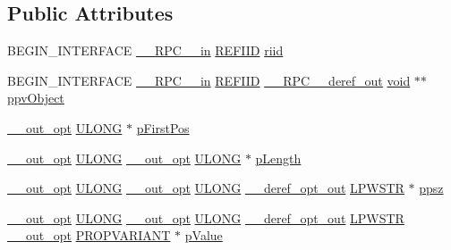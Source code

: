 \subsection*{Public Attributes}
\begin{DoxyCompactItemize}
\item 
B\+E\+G\+I\+N\+\_\+\+I\+N\+T\+E\+R\+F\+A\+CE \hyperlink{rpcsal_8h_a20b7f6da600a05c8b541659f14f7f0e6}{\+\_\+\+\_\+\+R\+P\+C\+\_\+\+\_\+in} \hyperlink{px__win__ds_8c_a80ec49c8ae61e234197d5071d2df497d}{R\+E\+F\+I\+ID} \hyperlink{struct_i_rich_chunk_vtbl_a59fa8bbd08359efd8efb56ecc9561eb5}{riid}
\item 
B\+E\+G\+I\+N\+\_\+\+I\+N\+T\+E\+R\+F\+A\+CE \hyperlink{rpcsal_8h_a20b7f6da600a05c8b541659f14f7f0e6}{\+\_\+\+\_\+\+R\+P\+C\+\_\+\+\_\+in} \hyperlink{px__win__ds_8c_a80ec49c8ae61e234197d5071d2df497d}{R\+E\+F\+I\+ID} \hyperlink{rpcsal_8h_a23bc188526f10656f9c79d950f6c3192}{\+\_\+\+\_\+\+R\+P\+C\+\_\+\+\_\+deref\+\_\+out} \hyperlink{sound_8c_ae35f5844602719cf66324f4de2a658b3}{void} $\ast$$\ast$ \hyperlink{struct_i_rich_chunk_vtbl_ab8607754b8af4a854b417de71c2fad74}{ppv\+Object}
\item 
\hyperlink{sal_8h_a1ab4597e9d0c9bcc3f676c58b25019fe}{\+\_\+\+\_\+out\+\_\+opt} \hyperlink{struct_i_rich_chunk_vtbl_ae509434e2b25f5b32ce7e0ac642b286a}{U\+L\+O\+NG} $\ast$ \hyperlink{struct_i_rich_chunk_vtbl_a29d23cc40cc329fd5d3d189ad00c6f8c}{p\+First\+Pos}
\item 
\hyperlink{sal_8h_a1ab4597e9d0c9bcc3f676c58b25019fe}{\+\_\+\+\_\+out\+\_\+opt} \hyperlink{struct_i_rich_chunk_vtbl_ae509434e2b25f5b32ce7e0ac642b286a}{U\+L\+O\+NG} \hyperlink{sal_8h_a1ab4597e9d0c9bcc3f676c58b25019fe}{\+\_\+\+\_\+out\+\_\+opt} \hyperlink{struct_i_rich_chunk_vtbl_ae509434e2b25f5b32ce7e0ac642b286a}{U\+L\+O\+NG} $\ast$ \hyperlink{struct_i_rich_chunk_vtbl_a1c86628815d0454f86afb2c82889741f}{p\+Length}
\item 
\hyperlink{sal_8h_a1ab4597e9d0c9bcc3f676c58b25019fe}{\+\_\+\+\_\+out\+\_\+opt} \hyperlink{struct_i_rich_chunk_vtbl_ae509434e2b25f5b32ce7e0ac642b286a}{U\+L\+O\+NG} \hyperlink{sal_8h_a1ab4597e9d0c9bcc3f676c58b25019fe}{\+\_\+\+\_\+out\+\_\+opt} \hyperlink{struct_i_rich_chunk_vtbl_ae509434e2b25f5b32ce7e0ac642b286a}{U\+L\+O\+NG} \hyperlink{sal_8h_aca83a5a174d598aaeea78f024e4af103}{\+\_\+\+\_\+deref\+\_\+opt\+\_\+out} \hyperlink{mapinls_8h_acc28f72b93422cfd63a60e5a102a77b1}{L\+P\+W\+S\+TR} $\ast$ \hyperlink{struct_i_rich_chunk_vtbl_a2b7db97f4d16e2075d0acced283e2328}{ppsz}
\item 
\hyperlink{sal_8h_a1ab4597e9d0c9bcc3f676c58b25019fe}{\+\_\+\+\_\+out\+\_\+opt} \hyperlink{struct_i_rich_chunk_vtbl_ae509434e2b25f5b32ce7e0ac642b286a}{U\+L\+O\+NG} \hyperlink{sal_8h_a1ab4597e9d0c9bcc3f676c58b25019fe}{\+\_\+\+\_\+out\+\_\+opt} \hyperlink{struct_i_rich_chunk_vtbl_ae509434e2b25f5b32ce7e0ac642b286a}{U\+L\+O\+NG} \hyperlink{sal_8h_aca83a5a174d598aaeea78f024e4af103}{\+\_\+\+\_\+deref\+\_\+opt\+\_\+out} \hyperlink{mapinls_8h_acc28f72b93422cfd63a60e5a102a77b1}{L\+P\+W\+S\+TR} \hyperlink{sal_8h_a1ab4597e9d0c9bcc3f676c58b25019fe}{\+\_\+\+\_\+out\+\_\+opt} \hyperlink{propidl_8h_ae902c1757cd16052896846fa4ebb88d8}{P\+R\+O\+P\+V\+A\+R\+I\+A\+NT} $\ast$ \hyperlink{struct_i_rich_chunk_vtbl_a3c5e271fe4f7418362a259c42f33babc}{p\+Value}
$$
\end{DoxyCompactItemize}
